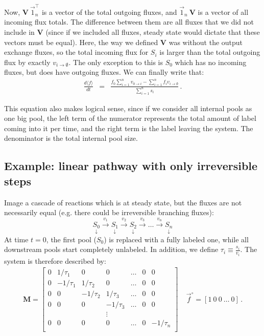 \documentclass{article}
\newcommand{\finit}{\ensuremath{\vec{f}^\circ}}
\newcommand{\fin}{\ensuremath{\langle f \rangle}}
\newcommand{\flux}[2]{\ensuremath{v_{{#1} \rightarrow {#2}}}}
\begin{document}
Now, $\mathbf{V}~\vec{1}_n^\top$ is a vector of the total outgoing fluxes, and $\vec{1}_n~\mathbf{V}$ is a vector of all incoming flux totals. The difference between them are all fluxes that we did not include in $\mathbf{V}$ (since if we included all fluxes, steady state would dictate that these vectors must be equal). Here, the way we defined $\mathbf{V}$ was without the output exchange fluxes, so the total incoming flux for $S_i$ is larger than the total outgoing flux by exactly $\flux{i}{\emptyset}$. The only exception to this is $S_0$ which has no incoming fluxes, but does have outgoing fluxes. We can finally write that:
\begin{eqnarray}
\frac{d\fin}{dt} &=& \frac{f_0 \sum_{i=1}^{n} \flux{0}{i} - \sum_{i=1}^{n} f_i \flux{i}{\emptyset}}{\sum_{i=1}^{n} s_i} \label{eq:dfin_dt}\,.
\end{eqnarray}

This equation also makes logical sense, since if we consider all internal pools as one big pool, the left term of the numerator represents the total amount of label coming into it per time, and the right term is the label leaving the system. The denominator is the total internal pool size.

\subsection{Example: linear pathway with only irreversible steps}
Image a cascade of reactions which is at steady state, but the fluxes are not necessarily equal (e.g. there could be irreversible branching fluxes):
\begin{equation}
    \underset{\downarrow}{S_0} 
    \xrightarrow{v_1} \underset{\downarrow}{S_1} 
    \xrightarrow{v_2} \underset{\downarrow}{S_2}
    \xrightarrow{v_3} \ldots 
    \xrightarrow{v_n} \underset{\downarrow}{S_n}
\end{equation}
At time $t = 0$, the first pool ($S_0$) is replaced with a fully labeled one, while all downstream pools start completely unlabeled. In addition, we define $\tau_i \equiv \frac{s_i}{v_i}$. The system is therefore described by:
\begin{eqnarray}
\mathbf{M} =
  \begin{bmatrix}
    0 & 1/\tau_1 & 0 & 0 & \ldots & 0 & 0\\
    0 & -1/\tau_1 & 1/\tau_2 & 0 & \ldots & 0 & 0\\
    0 & 0 & -1/\tau_2 & 1/\tau_3 & \ldots & 0 & 0\\
    0 & 0 & 0 & -1/\tau_3 & \ldots & 0 & 0\\
    & & & \vdots & & &\\
    0 & 0 & 0 & 0 & \ldots & 0 & -1/\tau_n \\
  \end{bmatrix}
~~~~~
\finit = \left[1~0~0~\ldots~0\right]\,.
\end{eqnarray}
\end{document}
